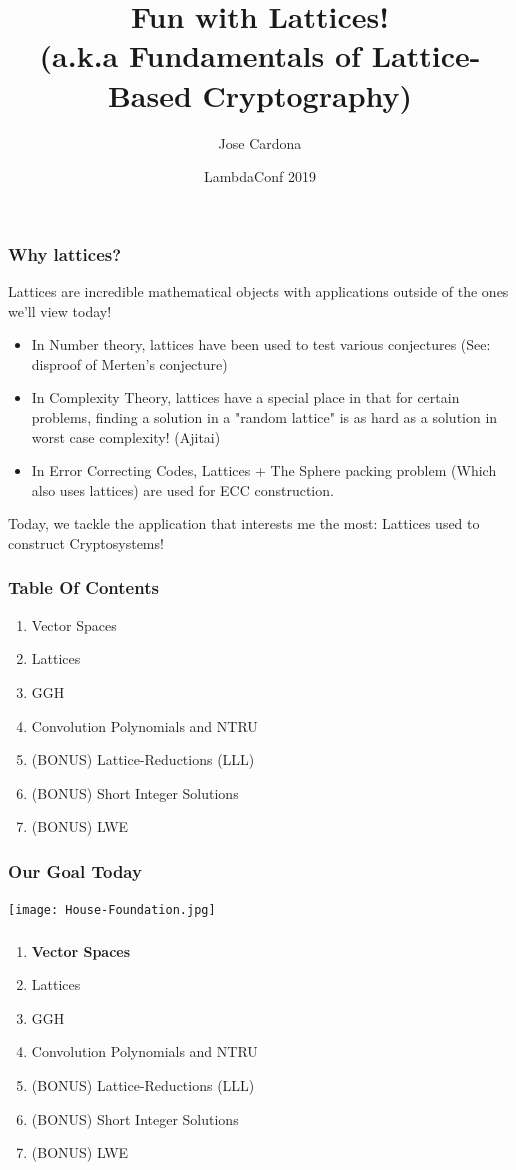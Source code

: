 \documentclass{beamer}
\title[Fundamentals of Lattice-Based Crypto]{Fun with Lattices! \\ (a.k.a Fundamentals of Lattice-Based Cryptography)}
\author{Jose Cardona}
\institute{OQuant}
\date[LC 2019]{LambdaConf 2019}
\begin{document}
 
\frame{\titlepage}

\author[Jose, Cardona] %
{}

\begin{frame}
\frametitle{Why lattices?}

Lattices are incredible mathematical objects with applications outside of the ones we'll view today!

\begin{itemize}
\item In Number theory, lattices have been used to test various conjectures (See: disproof of Merten's conjecture)
\item In Complexity Theory, lattices have a special place in that for certain problems, finding a solution in a "random lattice" is as hard as a solution in worst case complexity! (Ajitai)
\item In Error Correcting Codes, Lattices + The Sphere packing problem (Which also uses lattices) are used for ECC construction.
\end{itemize}

Today, we tackle the application that interests me the most: Lattices used to construct Cryptosystems!

\end{frame}

\begin{frame}
\frametitle{Table Of Contents}

\begin{enumerate}
\item Vector Spaces
\item Lattices
\item GGH
\item Convolution Polynomials and NTRU
\item (BONUS) Lattice-Reductions (LLL)
\item (BONUS) Short Integer Solutions
\item (BONUS) LWE
\end{enumerate}

\end{frame}

\begin{frame}
\frametitle{Our Goal Today}
\begin{center}
\texttt{[image: House-Foundation.jpg]}
\end{center}

\end{frame}

\begin{frame}
\frametitle{}

\begin{enumerate}
\item \textbf{Vector Spaces}
\item Lattices
\item GGH
\item Convolution Polynomials and NTRU
\item (BONUS) Lattice-Reductions (LLL)
\item (BONUS) Short Integer Solutions
\item (BONUS) LWE
\end{enumerate}

\end{frame}
\end{document}
